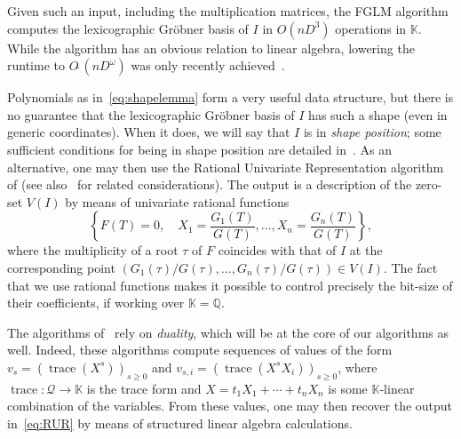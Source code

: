 \documentclass[final,1p,times,authoryear]{elsarticle}
\newcommand{\trace}{\operatorname{trace}}
\newcommand{\lf}{X}
\newcommand{\residueI}{\mathscr{Q}}
\def\Q {\ensuremath{\mathbb{Q}}}
\def\K{\mathbb{K}}
\def\K {\ensuremath{\mathbb{K}}}
\begin{document}
Given such an input, including the multiplication matrices, the FGLM
algorithm~\citep{FaGiLaMo93} computes the lexicographic Gr\"obner basis
of $I$ in $O(nD^3)$ operations in $\K$.  While the algorithm has an
obvious relation to linear algebra, lowering the runtime to
$O\tilde{~}(nD^\omega)$ was only recently
achieved~\citep{FaGaHuRe13,FaGaHuRe14,Neiger16}.

Polynomials as in~\cref{eq:shapelemma} form a very useful data
structure, but there is no guarantee that the lexicographic Gr\"obner
basis of $I$ has such a shape (even in generic coordinates). When it does, we will say that $I$ is
in {\em shape position}; some sufficient conditions for being in shape
position are detailed in~\citep{BeMoMaTr94}.  As an alternative, one
may then use the Rational Univariate Representation algorithm of
\citet{Rouillier99} (see also~\citep{AlBeRoWo94,BeWo96} for related
considerations). The output is a description of the zero-set $V(I)$ by
means of univariate rational functions
\begin{equation}\label{eq:RUR}
  \left\{  F(T)=0, \quad X_1 = \frac{G_1(T)}{G(T)}, \dots,X_n = \frac{G_n(T)}{G(T)} \right\},
\end{equation}
where the multiplicity of a root $\tau$ of $F$ coincides with that of
$I$ at the corresponding point
$(G_1(\tau)/G(\tau),\dots,G_n(\tau)/G(\tau)) \in V(I)$. The fact that
we use rational functions makes it possible to control
precisely the bit-size of their coefficients, if working over $\K=\Q$.

The algorithms of~\citet{AlBeRoWo94, BeWo96, Rouillier99} rely on
\emph{duality}, which will be at the core of our algorithms as well.
Indeed, these algorithms compute sequences of values of the form
$v_s=(\trace(\lf^s))_{s \ge 0}$ and 
$v_{s,i}=(\trace(\lf^s X_i))_{s \ge 0}$, where $\trace: \residueI \to \K$ is the trace 
form and $\lf=t_1 X_1 + \cdots + t_n X_n$ is some $\K$-linear combination of the variables.
From these values, one may then recover the output in~\cref{eq:RUR} by means
of structured linear algebra calculations.
\end{document}
